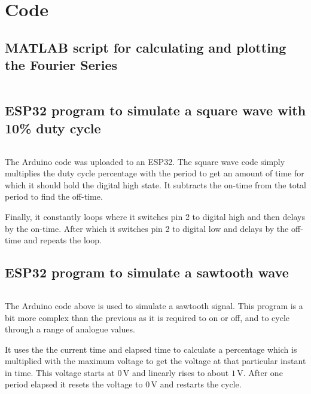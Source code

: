 \documentclass[a4paper, onecolumn, 12pt]{IEEEtran}
\begin{document}
\appendices

\printglossary[type=\acronymtype]

\section{Code}
\label{app:code}

\subsection{MATLAB script for calculating and plotting the Fourier Series}
\label{sec:MATLAB}
  \begin{mdframed}
        \inputminted{Matlab}{./code/prac_1_sim.m}
  \end{mdframed}

\subsection{ESP32 program to simulate a square wave with 10\% duty cycle}
\label{sec:esp_square50}
    \begin{mdframed}
        \inputminted{Arduino}{./code/PWM2.ino}
    \end{mdframed}
    
The Arduino code was uploaded to an ESP32. The square wave code simply multiplies the duty cycle percentage with the period to get an amount of time for which it should hold the digital high state. It subtracts the on-time from the total period to find the off-time. 

Finally, it constantly loops where it switches pin 2 to digital high and then delays by the on-time. After which it switches pin 2 to digital low and delays by the off-time and repeats the loop.

\subsection{ESP32 program to simulate a sawtooth wave}
\label{sec:esp_square10}
    \begin{mdframed}
        \inputminted{Arduino}{./code/SawTooth_Sketch.ino}
    \end{mdframed}
    
The Arduino code above is used to simulate a sawtooth signal. This program is a bit more complex than the previous as it is required to on or off, and to cycle through a range of analogue values.

It uses the the current time and elapsed time to calculate a percentage which is multiplied with the maximum voltage to get the voltage at that particular instant in time. This voltage starts at $0\,$V and linearly rises to about $1\,$V. After one period elapsed it resets the voltage to $0\,$V and restarts the cycle.
\end{document}
